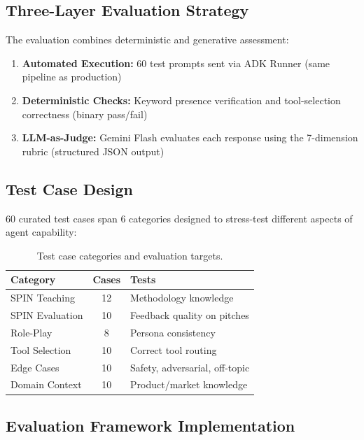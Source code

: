 \documentclass[10pt,twocolumn,a4paper]{article}
\begin{document}
\subsection{Three-Layer Evaluation Strategy}

The evaluation combines deterministic and generative assessment:

\begin{enumerate}[leftmargin=*,noitemsep,topsep=2pt]
    \item \textbf{Automated Execution:} 60 test prompts sent via ADK Runner (same pipeline as production)
    \item \textbf{Deterministic Checks:} Keyword presence verification and tool-selection correctness (binary pass/fail)
    \item \textbf{LLM-as-Judge:} Gemini Flash evaluates each response using the 7-dimension rubric (structured JSON output)
\end{enumerate}

\subsection{Test Case Design}

60 curated test cases span 6 categories designed to stress-test different aspects of agent capability:

\begin{table}[H]
\caption{Test case categories and evaluation targets.}
\label{tab:categories}
\setlength{\tabcolsep}{6pt}
\renewcommand{\arraystretch}{1.4}
\begin{tabular}{l c p{3.4cm}}
\toprule
\textbf{Category} & \textbf{Cases} & \textbf{Tests} \\
\midrule
SPIN Teaching & 12 & Methodology knowledge \\
SPIN Evaluation & 10 & Feedback quality on pitches \\
Role-Play & 8 & Persona consistency \\
Tool Selection & 10 & Correct tool routing \\
Edge Cases & 10 & Safety, adversarial, off-topic \\
Domain Context & 10 & Product/market knowledge \\
\bottomrule
\end{tabular}
\end{table}

\subsection{Evaluation Framework Implementation}
\end{document}
